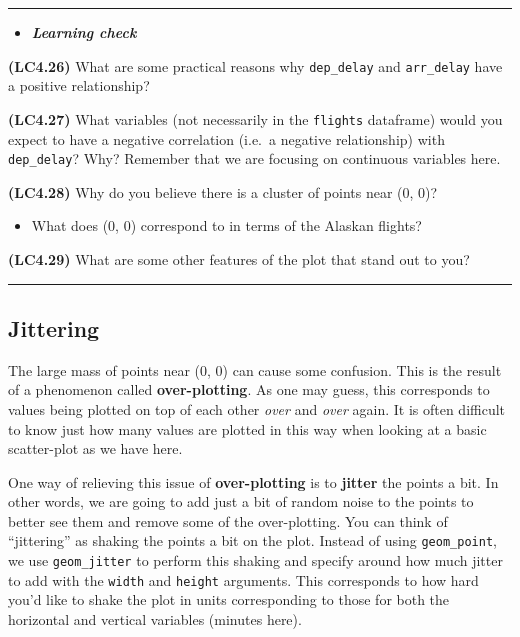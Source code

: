 \documentclass[]{tufte-book}
\providecommand{\tightlist}{%
  \setlength{\itemsep}{0pt}\setlength{\parskip}{0pt}}
\newenvironment{rmdblock}[1]
  {\begin{shaded*}
  \begin{itemize}
  \renewcommand{\labelitemi}{
    \raisebox{-.7\height}[0pt][0pt]{
    }
  }
  \item
  }
  {
  \end{itemize}
  \end{shaded*}
  }
\newenvironment{learncheck}
  {\begin{rmdblock}{warning}}
  {\end{rmdblock}}
\begin{document}
\begin{center}\rule{\linewidth}{\linethickness}\end{center}

\begin{learncheck}
\textbf{\emph{Learning check}}
\end{learncheck}

\textbf{(LC4.26)} What are some practical reasons why
\texttt{dep\_delay} and \texttt{arr\_delay} have a positive
relationship?

\textbf{(LC4.27)} What variables (not necessarily in the
\texttt{flights} dataframe) would you expect to have a negative
correlation (i.e.~a negative relationship) with \texttt{dep\_delay}?
Why? Remember that we are focusing on continuous variables here.

\textbf{(LC4.28)} Why do you believe there is a cluster of points near
(0, 0)?

\begin{itemize}
\tightlist
\item
  What does (0, 0) correspond to in terms of the Alaskan flights?
\end{itemize}

\textbf{(LC4.29)} What are some other features of the plot that stand
out to you?

\begin{center}\rule{\linewidth}{\linethickness}\end{center}

\subsection{Jittering}\label{jittering}

The large mass of points near (0, 0) can cause some confusion. This is
the result of a phenomenon called \textbf{over-plotting}. As one may
guess, this corresponds to values being plotted on top of each other
\emph{over} and \emph{over} again. It is often difficult to know just
how many values are plotted in this way when looking at a basic
scatter-plot as we have here.

One way of relieving this issue of \textbf{over-plotting} is to
\textbf{jitter} the points a bit. In other words, we are going to add
just a bit of random noise to the points to better see them and remove
some of the over-plotting. You can think of ``jittering'' as shaking the
points a bit on the plot. Instead of using \texttt{geom\_point}, we use
\texttt{geom\_jitter} to perform this shaking and specify around how
much jitter to add with the \texttt{width} and \texttt{height}
arguments. This corresponds to how hard you'd like to shake the plot in
units corresponding to those for both the horizontal and vertical
variables (minutes here).
\end{document}
